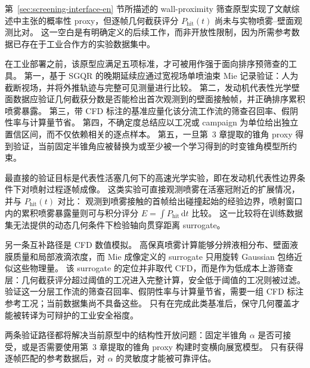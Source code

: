 第~\ref{sec:screening-interface-en} 节所描述的 wall-proximity 筛查原型实现了文献综述中主张的概率性 proxy，但逐帧几何截获评分 \(P_{\mathrm{hit}}(t)\) 尚未与实物喷雾--壁面观测比对。
这一空白是有明确定义的后续工作，而非开放性限制，因为所需参考数据已存在于工业合作方的实验数据集中。

在工业部署之前，该原型应满足五项标准，才可被用作强于面向排序预筛查的工具。
第一，基于 \(\mathrm{SGQR}\) 的晚期延续应通过宽视场单喷油束 Mie 记录验证：人为截断视场，并将外推轨迹与完整可见测量进行比较。
第二，发动机代表性光学壁面数据应验证几何截获分数是否能检出首次观测到的壁面接触帧，并正确排序累积喷雾暴露。
第三，带 CFD 标注的基准应量化该分流工作流的筛查召回率、假阴性率与计算量节省。
第四，不确定度总结应以工况或 campaign 为单位给出独立置信区间，而不仅依赖相关的逐点样本。
第五，一旦第~3 章提取的锥角 proxy 得到验证，当前固定半锥角应被替换为或至少被一个学习得到的时变锥角模型所约束。

最直接的验证目标是代表性活塞几何下的高速光学实验，即在发动机代表性边界条件下对喷射过程逐帧成像。
这类实验可直接观测喷雾在活塞冠附近的扩展情况，并与 \(P_{\mathrm{hit}}(t)\) 对比：
观测到喷雾接触的首帧给出碰撞起始的经验边界，喷射窗口内的累积喷雾暴露量则可与积分评分 \(E = \int P_{\mathrm{hit}}\,\mathrm{d}t\) 比较。
这一比较将在训练数据集无法提供的动态几何条件下检验轴向贯穿距离 surrogate。

另一条互补路径是 CFD 数值模拟。
高保真喷雾计算能够分辨液相分布、壁面液膜质量和局部液滴浓度，而 Mie 成像定义的 surrogate 只用旋转 Gaussian 包络近似这些物理量。
该 surrogate 的定位并非取代 CFD，而是作为低成本上游筛查层：几何截获评分超过阈值的工况进入完整计算，安全低于阈值的工况则被过滤。
验证这一分层工作流的筛查召回率、假阴性率与计算量节省，需要一组 CFD 标注参考工况；当前数据集尚不具备这些。
只有在完成此类基准后，保守几何覆盖才能被转译为可辩护的工业安全裕度。

两条验证路径都将解决当前原型中的结构性开放问题：固定半锥角 \(\alpha\) 是否可接受，或是否需要使用第~3 章提取的锥角 proxy 构建时变横向展宽模型。
只有获得逐帧匹配的参考数据后，对 \(\alpha\) 的灵敏度才能被可靠评估。
